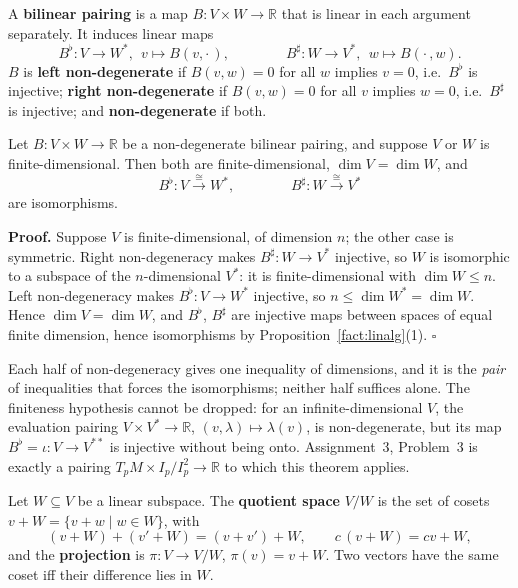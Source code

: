 \documentclass[11pt]{report}
\makeatletter
\newcounter{defcounter}[section]
\newcounter{thmcounter}[section]
\renewenvironment{proof}[1][Proof]{\noindent\textbf{#1.} }{\hfill$\square$\par\vspace{5pt}}
\newcommand{\thmlabel}[1]{\edef\@currentlabel{\arabic{section}.\arabic{thmcounter}}\label{#1}}
\newcommand{\deflabel}[1]{\edef\@currentlabel{\arabic{section}.\arabic{defcounter}}\label{#1}}
\newcommand{\leeref}[1]{\par\smallskip{\raggedleft\footnotesize\textsc{Lee}:\ #1\par}}
\makeatother
\begin{document}
\begin{defbox}\deflabel{def:pairing}
A \textbf{bilinear pairing} is a map $B : V \times W \to \mathbb{R}$ that is linear in each argument separately. It induces linear maps
\[
B^\flat : V \to W^*, \ \ v \mapsto B(v, \cdot\,), \qquad\qquad B^\sharp : W \to V^*, \ \ w \mapsto B(\cdot\,, w).
\]
$B$ is \textbf{left non-degenerate} if $B(v, w) = 0$ for all $w$ implies $v = 0$, i.e.\ $B^\flat$ is injective; \textbf{right non-degenerate} if $B(v, w) = 0$ for all $v$ implies $w = 0$, i.e.\ $B^\sharp$ is injective; and \textbf{non-degenerate} if both.
\end{defbox}

\begin{thmbox}\thmlabel{thm:pairing}
Let $B : V \times W \to \mathbb{R}$ be a non-degenerate bilinear pairing, and suppose $V$ or $W$ is finite-dimensional. Then both are finite-dimensional, $\dim V = \dim W$, and
\[
B^\flat : V \xrightarrow{\ \cong\ } W^*, \qquad\qquad B^\sharp : W \xrightarrow{\ \cong\ } V^*
\]
are isomorphisms.
\leeref{no counterpart}
\end{thmbox}

\begin{proof}
Suppose $V$ is finite-dimensional, of dimension $n$; the other case is symmetric. Right non-degeneracy makes $B^\sharp : W \to V^*$ injective, so $W$ is isomorphic to a subspace of the $n$-dimensional $V^*$: it is finite-dimensional with $\dim W \le n$. Left non-degeneracy makes $B^\flat : V \to W^*$ injective, so $n \le \dim W^* = \dim W$. Hence $\dim V = \dim W$, and $B^\flat$, $B^\sharp$ are injective maps between spaces of equal finite dimension, hence isomorphisms by Proposition~\ref{fact:linalg}(1).
\end{proof}

\begin{rembox}\label{rem:vector-spaces-2}
Each half of non-degeneracy gives one inequality of dimensions, and it is the \emph{pair} of inequalities that forces the isomorphisms; neither half suffices alone. The finiteness hypothesis cannot be dropped: for an infinite-dimensional $V$, the evaluation pairing $V \times V^* \to \mathbb{R}$, $(v, \lambda) \mapsto \lambda(v)$, is non-degenerate, but its map $B^\flat = \iota : V \to V^{**}$ is injective without being onto. Assignment~3, Problem~3 is exactly a pairing $T_pM \times I_p/I_p^2 \to \mathbb{R}$ to which this theorem applies.
\end{rembox}

\begin{defbox}\deflabel{def:quotient-vs}
Let $W \subseteq V$ be a linear subspace. The \textbf{quotient space} $V/W$ is the set of cosets $v + W = \{v + w \mid w \in W\}$, with
\[
(v + W) + (v' + W) = (v + v') + W, \qquad c\,(v + W) = cv + W,
\]
and the \textbf{projection} is $\pi : V \to V/W$, $\pi(v) = v + W$. Two vectors have the same coset iff their difference lies in $W$.
\leeref{App.~B, \emph{Vector Spaces}}
\end{defbox}
\end{document}
